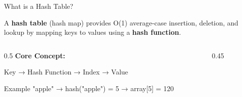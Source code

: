 \documentclass[aspectratio=169,xcolor=dvipsnames]{beamer}
\begin{document}
\begin{frame}{What is a Hash Table?}
  \begin{definition}
    A \textbf{hash table} (hash map) provides O(1) average-case insertion, deletion, and lookup by mapping keys to values using a \textbf{hash function}.
  \end{definition}

  \vspace{0.3cm}

  \begin{columns}
    \begin{column}{0.5\textwidth}
      \textbf{Core Concept:}
      \begin{center}
        Key → Hash Function → Index → Value
      \end{center}

      \vspace{0.3cm}

      \begin{exampleblock}{Example}
        "apple" → hash("apple") = 5 → array[5] = 120
      \end{exampleblock}
    \end{column}
    \begin{column}{0.45\textwidth}
    \end{column}
  \end{columns}
\end{frame}
\end{document}
